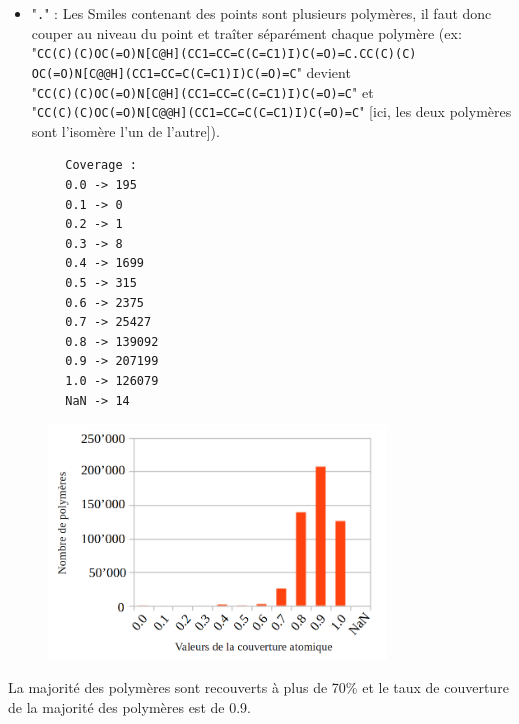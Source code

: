 \documentclass[11pt, a4paper]{report}
\begin{document}
	\begin{itemize}
		\item "\verb|.|" : Les Smiles contenant des points sont plusieurs polymères, il faut donc couper au niveau du point et traîter séparément chaque polymère (ex:
		\\"\verb|CC(C)(C)OC(=O)N[C@H](CC1=CC=C(C=C1)I)C(=O)=C.CC(C)(C)|\\\verb|OC(=O)N[C@@H](CC1=CC=C(C=C1)I)C(=O)=C|" devient \\"\verb|CC(C)(C)OC(=O)N[C@H](CC1=CC=C(C=C1)I)C(=O)=C|" et\\  "\verb|CC(C)(C)OC(=O)N[C@@H](CC1=CC=C(C=C1)I)C(=O)=C|" [ici, les deux polymères sont l'isomère l'un de l'autre]).
	\end{itemize}
	\begin{lstlisting}
		Coverage :
		0.0 -> 195
		0.1 -> 0
		0.2 -> 1
		0.3 -> 8
		0.4 -> 1699
		0.5 -> 315
		0.6 -> 2375
		0.7 -> 25427
		0.8 -> 139092
		0.9 -> 207199
		1.0 -> 126079
		NaN -> 14
	\end{lstlisting}
	
	
	
	\begin{figure}[H]
		\includegraphics[width=0.8\textwidth]{./images/ACs2m.png}
	\end{figure}
	La majorité des polymères sont recouverts à plus de 70\% et le taux de couverture de la majorité des polymères est de 0.9.
	
	
	
\end{document}
